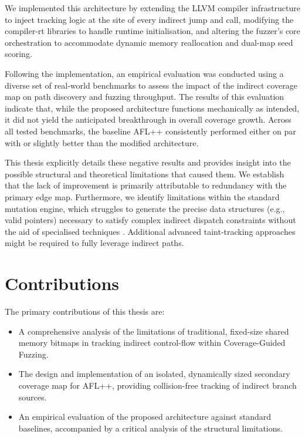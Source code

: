We implemented this architecture by extending the LLVM compiler infrastructure to inject tracking logic at the site of every indirect jump and call, modifying the compiler-rt libraries to handle runtime initialisation, and altering the fuzzer's core orchestration to accommodate dynamic memory reallocation and dual-map seed scoring.

Following the implementation, an empirical evaluation was conducted using a diverse set of real-world benchmarks to assess the impact of the indirect coverage map on path discovery and fuzzing throughput. The results of this evaluation indicate that, while the proposed architecture functions mechanically as intended, it did not yield the anticipated breakthrough in overall coverage growth. Across all tested benchmarks, the baseline AFL++ consistently performed either on par with or slightly better than the modified architecture.

This thesis explicitly details these negative results and provides insight into the possible structural and theoretical limitations that caused them. We establish that the lack of improvement is primarily attributable to redundancy with the primary edge map. Furthermore, we identify limitations within the standard mutation engine, which struggles to generate the precise data structures (e.g., valid pointers) necessary to satisfy complex indirect dispatch constraints without the aid of specialised techniques \cite{aschermann2019redqueen}. Additional advanced taint-tracking approaches \cite{wang2010taintscope} might be required to fully leverage indirect paths.

\section{Contributions}

The primary contributions of this thesis are:
\begin{itemize}
    \item A comprehensive analysis of the limitations of traditional, fixed-size shared memory bitmaps in tracking indirect control-flow within Coverage-Guided Fuzzing.

    \item The design and implementation of an isolated, dynamically sized secondary coverage map for AFL++, providing collision-free tracking of indirect branch sources.

    \item An empirical evaluation of the proposed architecture against standard baselines, accompanied by a critical analysis of the structural limitations.
\end{itemize}

